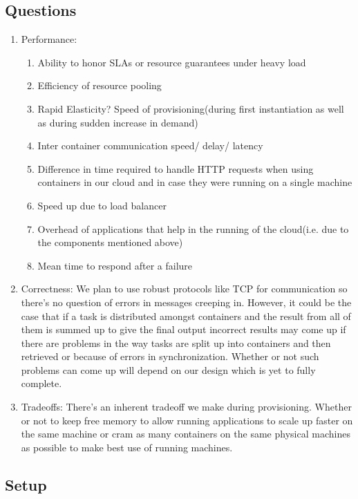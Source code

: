 \documentclass[a4paper]{article}
\begin{document}
  \subsection{Questions}
  \begin{enumerate}
	  
	  \item Performance:
	  \begin{enumerate}
	  \item Ability to honor SLAs or resource guarantees under heavy load
	  \item Efficiency of resource pooling
	  \item Rapid Elasticity? Speed of provisioning(during first instantiation as well as during sudden increase in demand)
	  \item Inter container communication speed/ delay/ latency
	  \item Difference in time required to handle HTTP requests when using containers in our cloud and in case they were running on a single machine
	  \item Speed up due to load balancer
	  \item Overhead of applications that help in the running of the cloud(i.e. due to the components mentioned above)
	  \item Mean time to respond after a failure
	  \end{enumerate}
	  
	  \item Correctness: We plan to use robust protocols like TCP for communication so there's no question of errors in messages creeping in. However, it could be the case that if a task is distributed amongst containers and the result from all of them is summed up to give the final output incorrect results may come up if there are problems in the way tasks are split up into containers and then retrieved or because of errors in synchronization. Whether or not such problems can come up will depend on our design which is yet to fully complete.
	  
	  \item Tradeoffs: There's an inherent tradeoff we make during provisioning. Whether or not to keep free memory to allow running applications to scale up faster on the same machine or cram as many containers on the same physical machines as possible to make best use of running machines.
  \end{enumerate}
  
  \subsection{Setup}
  
\end{document}
